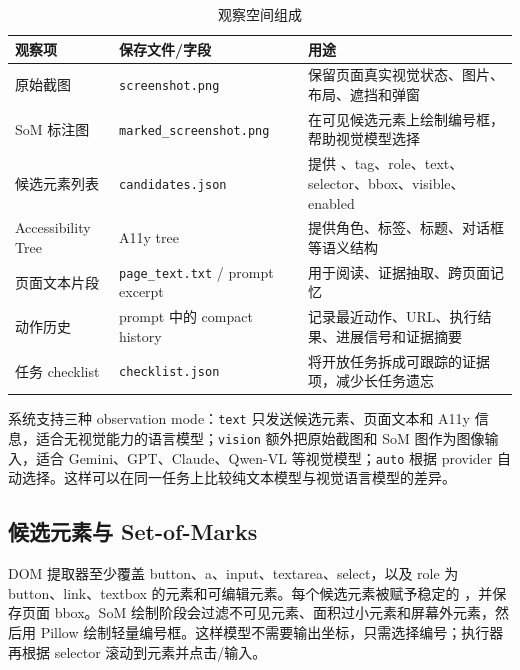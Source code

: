\begin{table}[H]
  \centering
  \caption{观察空间组成}
  \label{tab:observation-space}
  \small
  \begin{tabularx}{\textwidth}{p{}p{}Y}
    \toprule
    观察项 & 保存文件/字段 & 用途 \\
    \midrule
    原始截图 & \texttt{screenshot.png} & 保留页面真实视觉状态、图片、布局、遮挡和弹窗 \\
    SoM 标注图 & \texttt{marked\_screenshot.png} & 在可见候选元素上绘制编号框，帮助视觉模型选择  \\
    候选元素列表 & \texttt{candidates.json} & 提供 、tag、role、text、selector、bbox、visible、enabled \\
    Accessibility Tree & A11y tree & 提供角色、标签、标题、对话框等语义结构 \\
    页面文本片段 & \texttt{page\_text.txt} / prompt excerpt & 用于阅读、证据抽取、跨页面记忆 \\
    动作历史 & prompt 中的 compact history & 记录最近动作、URL、执行结果、进展信号和证据摘要 \\
    任务 checklist & \texttt{checklist.json} & 将开放任务拆成可跟踪的证据项，减少长任务遗忘 \\
    \bottomrule
  \end{tabularx}
\end{table}

系统支持三种 observation mode：\texttt{text} 只发送候选元素、页面文本和 A11y 信息，适合无视觉能力的语言模型；\texttt{vision} 额外把原始截图和 SoM 图作为图像输入，适合 Gemini、GPT、Claude、Qwen-VL 等视觉模型；\texttt{auto} 根据 provider 自动选择。这样可以在同一任务上比较纯文本模型与视觉语言模型的差异。

\subsection{候选元素与 Set-of-Marks}

DOM 提取器至少覆盖 button、a、input、textarea、select，以及 role 为 button、link、textbox 的元素和可编辑元素。每个候选元素被赋予稳定的 ，并保存页面 bbox。SoM 绘制阶段会过滤不可见元素、面积过小元素和屏幕外元素，然后用 Pillow 绘制轻量编号框。这样模型不需要输出坐标，只需选择编号；执行器再根据 selector 滚动到元素并点击/输入。

